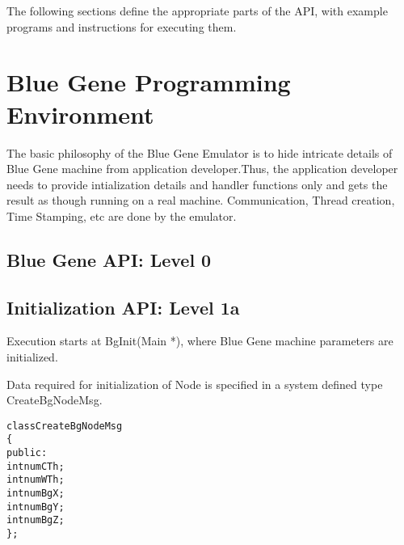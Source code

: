 \documentclass[10pt]{article}
\begin{document}
The following sections define the appropriate parts of the API, with
example programs and instructions for executing them.

\section{Blue Gene Programming Environment}

The basic philosophy of the Blue Gene Emulator is to hide intricate details
of Blue Gene machine from
application developer.Thus, the application developer needs to provide
intialization details and handler
functions only and gets the result as though running on a real machine.
Communication, Thread creation,
Time Stamping, etc are done by the emulator.

\subsection{Blue Gene API: Level 0}




\subsection{Initialization API: Level 1a}

Execution starts at BgInit(Main *), where Blue Gene machine parameters are
initialized.


Data required for initialization of Node is specified in a system
defined type CreateBgNodeMsg.

\begin{alltt}
        class CreateBgNodeMsg
        \{
                public:
                  int numCTh ;
                  int numWTh ;
                  int numBgX ;
                  int numBgY ;
                  int numBgZ ;
        \} ;
\end{alltt}
\end{document}
